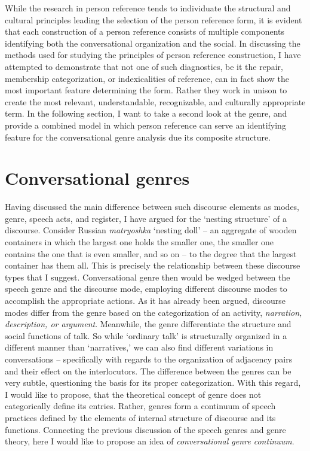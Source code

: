 \documentclass[12pt, draft]{article}
\begin{document}
While the research in person reference tends to individuate the structural and cultural principles leading the selection of the person reference form, it is evident that each construction of a person reference consists of multiple components identifying both the conversational organization and the social. In discussing the methods used for studying the principles of person reference construction, I have attempted to demonstrate that not one of such diagnostics, be it the repair, membership categorization, or indexicalities of reference, can in fact show the most important feature determining the form. Rather they work in unison to create the most relevant, understandable, recognizable, and culturally appropriate term. In the following section, I want to take a second look at the genre, and provide a combined model in which person reference can serve an identifying feature for the conversational genre analysis due its composite structure. 
\section{Conversational genres}
Having discussed the main difference between such discourse elements as modes, genre, speech acts, and register, I have argued for the `nesting structure' of a discourse. Consider Russian \textit{matryoshka} `nesting doll' -- an aggregate of wooden containers in which the largest one holds the smaller one, the smaller one contains the one that is even smaller, and so on -- to the degree that the largest container has them all. This is precisely the relationship between these discourse types that I suggest. Conversational genre then would be wedged between the speech genre and the discourse mode, employing different discourse modes to accomplish the appropriate actions. As it has already been argued, discourse modes differ from the genre based on the categorization of an activity, \textit{narration, description, or argument}. Meanwhile, the genre differentiate the structure and social functions of talk. So while `ordinary talk' is structurally organized in a different manner than `narratives,' we can also find different variations in conversations -- specifically with regards to the organization of adjacency pairs and their effect on the interlocutors. The difference between the genres can be very subtle, questioning the basis for its proper categorization. With this regard, I would like to propose, that the theoretical concept of genre does not categorically define its entries. Rather, genres form a continuum of speech practices defined by the elements of internal structure of discourse and its functions. 
Connecting the previous discussion of the speech genres and genre theory, here I would like to propose an idea of \textit{conversational genre continuum}. 
\end{document}
